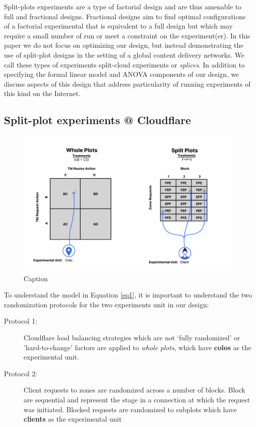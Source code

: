 \documentclass{article}
\begin{document}
Split-plots experiments are a type of factorial design and are thus amenable to full and fractional designs. Fractional designs aim to find optimal configurations of a factorial experimental that is equivalent to a full design but which may require a small number of run or meet a constraint on the experiment(er). In this paper we do not focus on optimizing our design, but instead demonstrating the use of split-plot designs in the setting of a global content delivery networks. We call these types of experiments split-cloud experiments or \textit{splices}. In addition to specifying the formal linear model and ANOVA components of our design, we discuss aspects of this design that address particularity of running experiments of this kind on the Internet. 

\subsection{Split-plot experiments @ Cloudflare}

\begin{figure}
    \centering
    \includegraphics[width=0.8\linewidth]{images/design-split.png}
    \caption{Caption}
    \label{fig:enter-label}
\end{figure}
To understand the model in Equation \ref{eq1}, it is important to understand the two randomization protocols for the two experiments unit in our design:  
\begin{description}
    \item [Protocol 1: ] Cloudflare load balancing strategies which are not `fully randomized' or 'hard-to-change' factors are applied to \textit{whole plots}, which have \textbf{colos} as the experimental unit.
     \item [Protocol 2: ] Client requests to zones are randomized across a number of blocks. Block are sequential and represent the stage in a connection at which the request was initiated. Blocked requests are randomized to subplots which have \textbf{clients} as the experimental unit 
\end{description}
\end{document}
